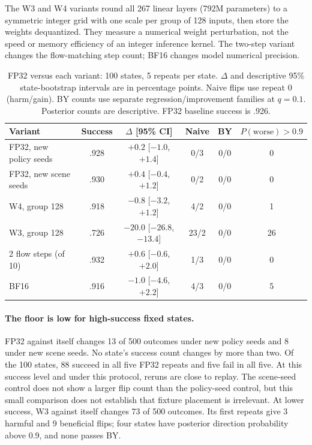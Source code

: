 \documentclass{article}
\begin{document}
The W3 and W4 variants round all 267 linear layers (792M parameters) to a symmetric
integer grid with one scale per group of 128 inputs, then store the weights dequantized.
They measure a numerical weight perturbation, not the speed or memory efficiency of
an integer inference kernel. The two-step variant changes the flow-matching step
count; BF16 changes model numerical precision.

\begin{table}[t]
  \centering
  \small
  \caption{FP32 versus each variant: 100 states, 5 repeats per state.
  $\Delta$ and descriptive 95\% state-bootstrap intervals are in percentage points.
  Naive flips use repeat 0 (harm/gain). BY counts use separate regression/improvement
  families at $q=0.1$. Posterior counts are descriptive. FP32 baseline success is .926.}
  \label{tab:xvla}
  \setlength{\tabcolsep}{3.5pt}
  \begin{tabular}{lccccc}
    \toprule
    Variant & Success & $\Delta$ [95\% CI] & Naive & BY & $P(\text{worse})>0.9$\\
    \midrule
    FP32, new policy seeds & .928 & $+0.2$ [$-1.0$, $+1.4$] & 0/3 & 0/0 & 0\\
    FP32, new scene seeds & .930 & $+0.4$ [$-0.4$, $+1.2$] & 0/2 & 0/0 & 0\\
    W4, group 128 & .918 & $-0.8$ [$-3.2$, $+1.2$] & 4/2 & 0/0 & 1\\
    W3, group 128 & .726 & $-20.0$ [$-26.8$, $-13.4$] & 23/2 & 0/0 & 26\\
    2 flow steps (of 10) & .932 & $+0.6$ [$-0.6$, $+2.0$] & 1/3 & 0/0 & 0\\
    BF16 & .916 & $-1.0$ [$-4.6$, $+2.2$] & 4/3 & 0/0 & 5\\
    \bottomrule
  \end{tabular}
\end{table}

\paragraph{The floor is low for high-success fixed states.}
FP32 against itself changes 13 of 500 outcomes under new policy seeds and 8 under
new scene seeds. No state's success count changes by more than two. Of the 100 states,
88 succeed in all five FP32 repeats and five fail in all five.
At this success level and under this protocol, reruns are close to replay.
The scene-seed control does not show a larger flip count than the policy-seed control,
but this small comparison does not establish that fixture placement is irrelevant.
At lower success, W3 against itself changes 73 of 500 outcomes. Its first repeats give
3 harmful and 9 beneficial flips; four states have posterior direction probability
above 0.9, and none passes BY.
\end{document}

